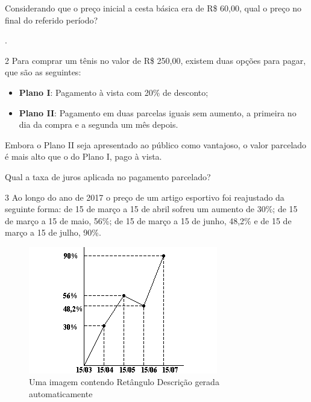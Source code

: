 \begin{escolha}
\begin{boxmedio}
\begin{boxmedio}
{\begin{boxpeq}
\begin{boxpeq}
{Considerando que o preço inicial a cesta básica era de R\$ 60,00, qual
o preço no final do referido período?

\begin{boxpeq}
.

\num{2} Para comprar um tênis no valor de R\$ 250,00, existem duas opções
para pagar, que são as seguintes:

\begin{itemize}
  \item \textbf{Plano I}: Pagamento à vista com 20\% de desconto;

  \item \textbf{Plano II}: Pagamento em duas parcelas iguais sem aumento, a primeira no dia da compra e a segunda um mês depois.
\end{itemize}

Embora o Plano II seja apresentado ao público como vantajoso, o valor
parcelado é mais alto que o do Plano I, pago à vista.

Qual a taxa de juros aplicada no pagamento parcelado?


\num{3} Ao longo do ano de 2017 o preço de um artigo esportivo foi
reajustado da seguinte forma: de 15 de março a 15 de abril sofreu um
aumento de 30\%; de 15 de março a 15 de maio, 56\%; de 15 de março a 15
de junho, 48,2\% e de 15 de março a 15 de julho, 90\%.

\begin{figure}
\centering
\includegraphics[width=3.25in,height=2.18333in]{./_SAEB_9_MAT/media/image58.png}
\caption{Uma imagem contendo Retângulo Descrição gerada automaticamente}
\end{figure}


\end{boxpeq}}
\end{boxpeq}
\end{boxpeq}}
\end{boxmedio}
\end{boxmedio}
\end{escolha}
